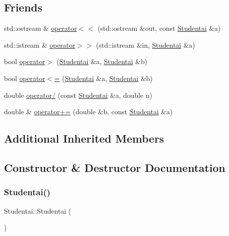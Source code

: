 \subsection*{Friends}
\begin{DoxyCompactItemize}
\item 
std\+::ostream \& \mbox{\hyperlink{class_studentai_a7fa0ac541336749ef2d674fd1996e8d5}{operator$<$$<$}} (std\+::ostream \&out, const \mbox{\hyperlink{class_studentai}{Studentai}} \&a)
\item 
std\+::istream \& \mbox{\hyperlink{class_studentai_a26a2195becea6f359ea305a80239387e}{operator$>$$>$}} (std\+::istream \&in, \mbox{\hyperlink{class_studentai}{Studentai}} \&a)
\item 
bool \mbox{\hyperlink{class_studentai_a6d7c4a8ee5a8fa7c191e5ecfb41645b5}{operator$>$}} (\mbox{\hyperlink{class_studentai}{Studentai}} \&a, \mbox{\hyperlink{class_studentai}{Studentai}} \&b)
\item 
bool \mbox{\hyperlink{class_studentai_a899347d8f518e1b28175dda7b5674cf2}{operator$<$=}} (\mbox{\hyperlink{class_studentai}{Studentai}} \&a, \mbox{\hyperlink{class_studentai}{Studentai}} \&b)
\item 
double \mbox{\hyperlink{class_studentai_aa6578f090b8fb8fa338d6d1481b787bf}{operator/}} (const \mbox{\hyperlink{class_studentai}{Studentai}} \&a, double n)
\item 
double \& \mbox{\hyperlink{class_studentai_a8525ba4a0a62f787170476026ab2e661}{operator+=}} (double \&b, const \mbox{\hyperlink{class_studentai}{Studentai}} \&a)
\end{DoxyCompactItemize}
\subsection*{Additional Inherited Members}


\subsection{Constructor \& Destructor Documentation}
\mbox{\label{class_studentai_a8f53d55bca475d5bf1973f4f3c53f047}} 
\subsubsection{\texorpdfstring{Studentai()}{Studentai()}\hspace{0.1cm}{\footnotesize\ttfamily [1/2]}}
{\footnotesize\ttfamily Studentai\+::\+Studentai (\begin{DoxyParamCaption}{ }\end{DoxyParamCaption})\hspace{0.3cm}{\ttfamily [inline]}}

